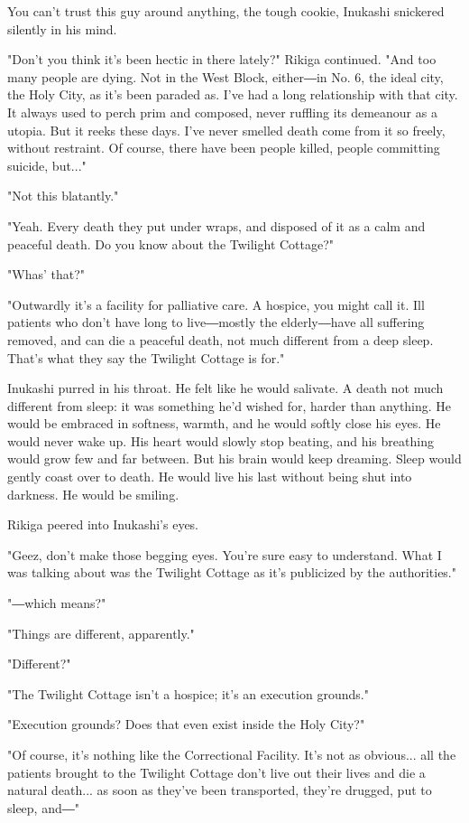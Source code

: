 You can't trust this guy around anything, the tough cookie, Inukashi
snickered silently in his mind.

"Don't you think it's been hectic in there lately?" Rikiga continued.
"And too many people are dying. Not in the West Block, either―in No. 6,
the ideal city, the Holy City, as it's been paraded as. I've had a long
relationship with that city. It always used to perch prim and composed,
never ruffling its demeanour as a utopia. But it reeks these days. I've
never smelled death come from it so freely, without restraint. Of
course, there have been people killed, people committing suicide,
but..."

"Not this blatantly."

"Yeah. Every death they put under wraps, and disposed of it as a calm
and peaceful death. Do you know about the Twilight Cottage?"

"Whas' that?"

"Outwardly it's a facility for palliative care. A hospice, you might
call it. Ill patients who don't have long to live―mostly the
elderly―have all suffering removed, and can die a peaceful death, not
much different from a deep sleep. That's what they say the Twilight
Cottage is for."

Inukashi purred in his throat. He felt like he would salivate. A death
not much different from sleep: it was something he'd wished for, harder
than anything. He would be embraced in softness, warmth, and he would
softly close his eyes. He would never wake up. His heart would slowly
stop beating, and his breathing would grow few and far between. But his
brain would keep dreaming. Sleep would gently coast over to death. He
would live his last without being shut into darkness. He would be
smiling.

Rikiga peered into Inukashi's eyes.

"Geez, don't make those begging eyes. You're sure easy to understand.
What I was talking about was the Twilight Cottage as it's publicized by
the authorities."

"―which means?"

"Things are different, apparently."

"Different?"

"The Twilight Cottage isn't a hospice; it's an execution grounds."

"Execution grounds? Does that even exist inside the Holy City?"

"Of course, it's nothing like the Correctional Facility. It's not as
obvious... all the patients brought to the Twilight Cottage don't live
out their lives and die a natural death... as soon as they've been
transported, they're drugged, put to sleep, and―"

